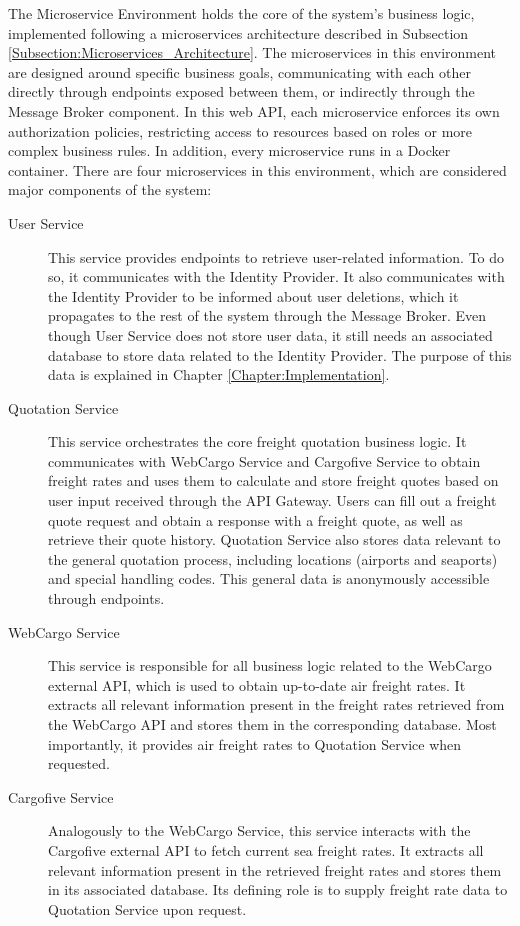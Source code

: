 \documentclass[12pt, reqno]{amsbook}
\theoremstyle{definition}
\theoremstyle{definition}
\numberwithin{section}{chapter}
\numberwithin{table}{chapter}
\numberwithin{figure}{chapter}
\begin{document}
The Microservice Environment holds the core of the system's business logic, implemented following a microservices architecture described in Subsection \ref{Subsection:Microservices_Architecture}. The microservices in this environment are designed around specific business goals, communicating with each other directly through endpoints exposed between them, or indirectly through the Message Broker component. In this web \ac{API}, each microservice enforces its own authorization policies, restricting access to resources based on roles or more complex business rules. In addition, every microservice runs in a Docker container.
There are four microservices in this environment, which are considered major components of the system:
\begin{description}
  \item[User Service] This service provides endpoints to retrieve user-related information. To do so, it communicates with the Identity Provider. It also communicates with the Identity Provider to be informed about user deletions, which it propagates to the rest of the system through the Message Broker. Even though User Service does not store user data, it still needs an associated database to store data related to the Identity Provider. The purpose of this data is explained in Chapter \ref{Chapter:Implementation}.
  \item[Quotation Service] This service orchestrates the core freight quotation business logic. It communicates with WebCargo Service and Cargofive Service to obtain freight rates and uses them to calculate and store freight quotes based on user input received through the \ac{API} Gateway. Users can fill out a freight quote request and obtain a response with a freight quote, as well as retrieve their quote history. Quotation Service also stores data relevant to the general quotation process, including locations (airports and seaports) and special handling codes. This general data is anonymously accessible through endpoints.
  \item[WebCargo Service] This service is responsible for all business logic related to the \mbox{WebCargo} external \ac{API}, which is used to obtain up-to-date air freight rates. It extracts all relevant information present in the freight rates retrieved from the WebCargo \ac{API} and stores them in the corresponding database. Most importantly, it provides air freight rates to Quotation Service when requested.
  \item[Cargofive Service] Analogously to the WebCargo Service, this service interacts with the Cargofive external \ac{API} to fetch current sea freight rates. It extracts all relevant information present in the retrieved freight rates and stores them in its associated database. Its defining role is to supply freight rate data to Quotation Service upon request.
\end{description}
\end{document}
